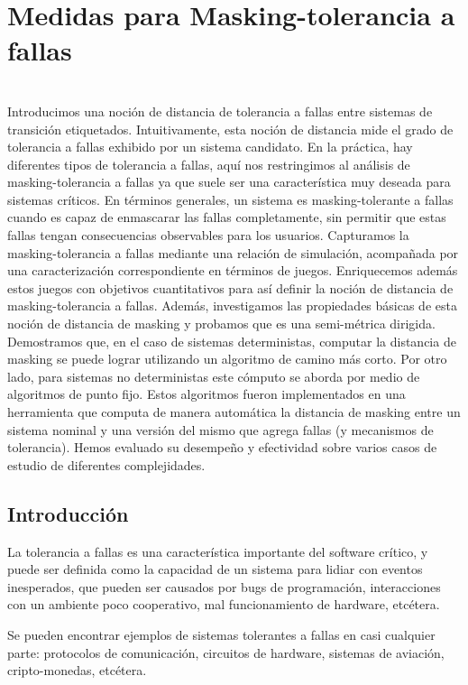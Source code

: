 \chapter{Medidas para Masking-tolerancia a fallas}
\label{cap:maskingMeasure}

 \\
Introducimos una noción de distancia de tolerancia a fallas entre sistemas de transición etiquetados. Intuitivamente, esta noción de distancia mide el grado de tolerancia a fallas exhibido por un sistema candidato.
En la práctica, hay diferentes tipos de tolerancia a fallas, aquí nos restringimos al análisis de masking-tolerancia a fallas ya que suele ser una característica muy deseada para sistemas críticos.
En términos generales, un sistema es masking-tolerante a fallas cuando es capaz de enmascarar las fallas completamente, sin permitir que estas fallas tengan consecuencias observables para los usuarios.
Capturamos la masking-tolerancia a fallas mediante una relación de simulación, acompañada por una caracterización correspondiente en términos de juegos.
Enriquecemos además estos juegos con objetivos cuantitativos para así definir la noción de distancia de masking-tolerancia a fallas.
Además, investigamos las propiedades básicas de esta noción de distancia de masking y probamos que es una semi-métrica dirigida.
Demostramos que, en el caso de sistemas deterministas, computar la distancia de masking se puede lograr utilizando un algoritmo de camino más corto.
Por otro lado, para sistemas no deterministas este cómputo se aborda por medio de algoritmos de punto fijo.
Estos algoritmos fueron implementados en una herramienta que computa de manera automática la distancia de masking entre un sistema nominal y una versión del mismo que agrega fallas (y mecanismos de tolerancia). Hemos evaluado su desempeño y efectividad sobre varios casos de estudio de diferentes complejidades.

\section{Introducción} \label{sec:intro}

La tolerancia a fallas es una característica importante del software crítico, y puede ser definida como la capacidad de un sistema para lidiar con eventos inesperados, que pueden ser causados por bugs de programación, interacciones con un ambiente poco cooperativo, mal funcionamiento de hardware, etcétera.

Se pueden encontrar ejemplos de sistemas tolerantes a fallas en casi cualquier parte: protocolos de comunicación, circuitos de hardware, sistemas de aviación, cripto-monedas, etcétera.


